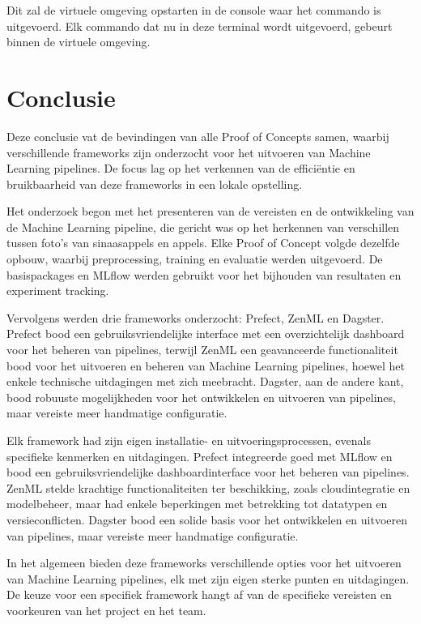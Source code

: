 Dit zal de virtuele omgeving opstarten in de console waar het commando is uitgevoerd. Elk commando dat nu in deze terminal wordt uitgevoerd, gebeurt binnen de virtuele omgeving.






\section{Conclusie}
Deze conclusie vat de bevindingen van alle Proof of Concepts samen, waarbij verschillende frameworks zijn onderzocht voor het uitvoeren van Machine Learning pipelines. De focus lag op het verkennen van de efficiëntie en bruikbaarheid van deze frameworks in een lokale opstelling.

Het onderzoek begon met het presenteren van de vereisten en de ontwikkeling van de Machine Learning pipeline, die gericht was op het herkennen van verschillen tussen foto's van sinaasappels en appels. Elke Proof of Concept volgde dezelfde opbouw, waarbij preprocessing, training en evaluatie werden uitgevoerd. De basispackages en MLflow werden gebruikt voor het bijhouden van resultaten en experiment tracking.

Vervolgens werden drie frameworks onderzocht: Prefect, ZenML en Dagster. Prefect bood een gebruiksvriendelijke interface met een overzichtelijk dashboard voor het beheren van pipelines, terwijl ZenML een geavanceerde functionaliteit bood voor het uitvoeren en beheren van Machine Learning pipelines, hoewel het enkele technische uitdagingen met zich meebracht. Dagster, aan de andere kant, bood robuuste mogelijkheden voor het ontwikkelen en uitvoeren van pipelines, maar vereiste meer handmatige configuratie.

Elk framework had zijn eigen installatie- en uitvoeringsprocessen, evenals specifieke kenmerken en uitdagingen. Prefect integreerde goed met MLflow en bood een gebruiksvriendelijke dashboardinterface voor het beheren van pipelines. ZenML stelde krachtige functionaliteiten ter beschikking, zoals cloudintegratie en modelbeheer, maar had enkele beperkingen met betrekking tot datatypen en versieconflicten. Dagster bood een solide basis voor het ontwikkelen en uitvoeren van pipelines, maar vereiste meer handmatige configuratie.

In het algemeen bieden deze frameworks verschillende opties voor het uitvoeren van Machine Learning pipelines, elk met zijn eigen sterke punten en uitdagingen. De keuze voor een specifiek framework hangt af van de specifieke vereisten en voorkeuren van het project en het team.